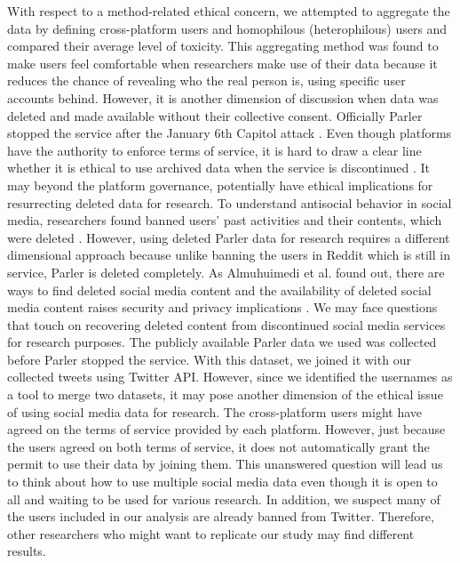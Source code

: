 \documentclass[Crown,sagev,times]{sagej}
\begin{document}
With respect to a method-related ethical concern, we attempted to aggregate the data by defining cross-platform users and homophilous (heterophilous) users and compared their average level of toxicity. This aggregating method was found to make users feel comfortable when researchers make use of their data \cite{dubois2020journalists} because it reduces the chance of revealing who the real person is, using specific user accounts behind. However, it is another dimension of discussion when data was deleted and made available without their collective consent. Officially Parler stopped the service after the January 6th Capitol attack \cite{m2021political}. Even though platforms have the authority to enforce terms of service, it is hard to draw a clear line \cite{blackwell2017classification} whether it is ethical to use archived data when the service is discontinued \cite{fiesler2020no}. It may beyond the platform governance, potentially have ethical implications for resurrecting deleted data for research. To understand antisocial behavior in social media, researchers found banned users' past activities and their contents, which were deleted \cite{chandrasekharan2017you}. However, using deleted Parler data for research requires a different dimensional approach because unlike banning the users in Reddit which is still in service, Parler is deleted completely. As Almuhuimedi et al. found out, there are ways to find deleted social media content and the availability of deleted social media content raises security and privacy implications \cite{almuhimedi2013tweets}. We may face questions that touch on recovering deleted content from discontinued social media services for research purposes.  
The publicly available Parler data \cite{aliapoulios2021large} we used was collected before Parler stopped the service. With this dataset, we joined it with our collected tweets using Twitter API. However, since we identified the usernames as a tool to merge two datasets, it may pose another dimension of the ethical issue of using social media data for research. The cross-platform users might have agreed on the terms of service provided by each platform. However, just because the users agreed on both terms of service, it does not automatically grant the permit to use their data by joining them. This unanswered question will lead us to think about how to use multiple social media data even though it is open to all and waiting to be used for various research. In addition, we suspect many of the users included in our analysis are already banned from Twitter. Therefore, other researchers who might want to replicate our study may find different results. 
    
\end{document}
